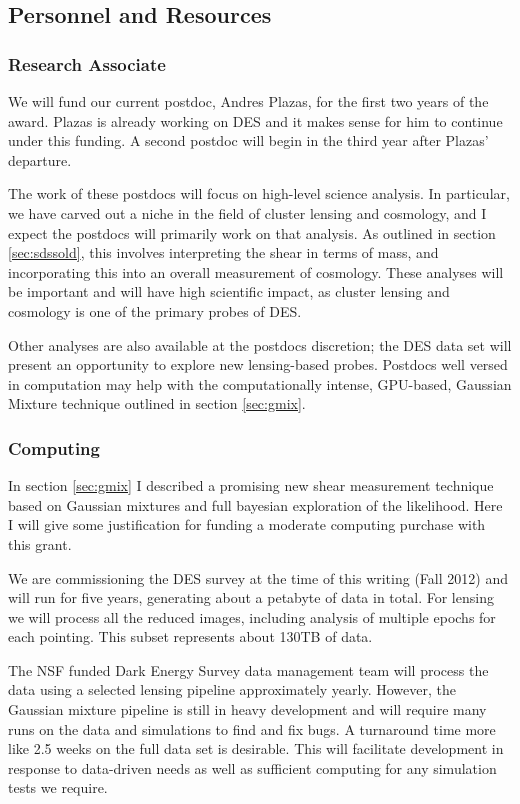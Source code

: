 \documentclass[12pt]{article}
\newcommand{\commissdate}{Fall 2012}
\begin{document}
\subsection{Personnel and Resources} \label{sec:resources}

\subsubsection{Research Associate}

We will fund our current postdoc, Andres Plazas, for the first two years of the
award. Plazas is already working on DES and it makes sense for him to continue
under this funding.  A second postdoc will begin in the third year after Plazas'
departure.  

The work of these postdocs will focus on high-level science analysis.  In
particular, we have carved out a niche in the field of cluster lensing and
cosmology, and I expect the postdocs will primarily work on that analysis.  As
outlined in section \ref{sec:sdssold}, this involves interpreting the shear in
terms of mass, and incorporating this into an overall measurement of cosmology.
These analyses will be important and will have high scientific impact, as
cluster lensing and cosmology is one of the primary probes of DES.

Other analyses are also available at the postdocs discretion; the DES data set
will present an opportunity to explore new lensing-based probes.  Postdocs well
versed in computation may help with the computationally intense, GPU-based,
Gaussian Mixture technique outlined in section \ref{sec:gmix}.

\subsubsection{Computing} \label{sec:computing}

In section \ref{sec:gmix} I described a promising new shear measurement
technique based on Gaussian mixtures and full bayesian exploration of the
likelihood.  Here I will give some justification for funding a moderate
computing purchase with this grant.

We are commissioning the DES survey at the time of this writing (\commissdate)
and will run for five years, generating about a petabyte of data in total.  For
lensing we will process all the reduced images, including analysis of multiple
epochs for each pointing.  This subset represents about 130TB of data.

The NSF funded Dark Energy Survey data management team will process the data
using a selected lensing pipeline approximately yearly.  However, the Gaussian
mixture pipeline is still in heavy development and will require many runs on
the data and simulations to find and fix bugs.  A turnaround time more like 2.5
weeks on the full data set is desirable.   This will facilitate development in
response to data-driven needs as well as sufficient computing for any
simulation tests we require.
\end{document}
